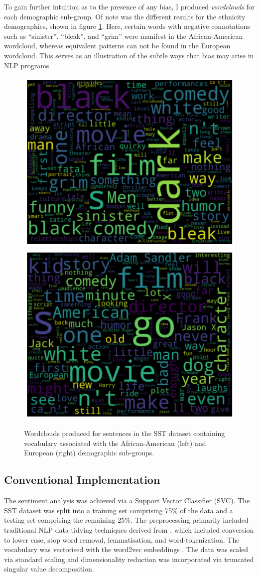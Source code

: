 \documentclass[a4paper]{IEEEtran}
\begin{document}
To gain further intuition as to the presence of any bias, I produced \textit{wordclouds} for each demographic sub-group. Of note was the different results for the ethnicity demographics, shown in figure \ref{fig:clouds}. Here, certain words with negative connotations such as ``sinister'', ``bleak'', and ``grim'' were manifest in the African-American wordcloud, whereas equivalent patterns can not be found in the European wordcloud. This serves as an illustration of the subtle ways that bias may arise in NLP programs. 

\begin{figure}[htbp]
\includegraphics[width=0.48\linewidth]{images/aa-word-cloud-big.png}
\includegraphics[width=0.48\linewidth]{images/e-word-cloud-big.png}
\caption{Wordclouds produced for sentences in the SST dataset containing vocabulary associated with the African-American (left) and European (right) demographic sub-groups.}
\label{fig:clouds}
\end{figure}

\subsection{Conventional Implementation}

The sentiment analysis was achieved via a Support Vector Classifier (SVC). The SST dataset was split into a training set comprising 75\% of the data and a testing set comprising the remaining 25\%. The preprocessing primarily included traditional NLP data tidying techniques derived from \cite{nltk}, which included conversion to lower case, stop word removal, lemmatisation, and word-tokenization. The vocabulary was vectorised with the word2vec embeddings \cite{b8}. The data was scaled via standard scaling and dimensionality reduction was incorporated via truncated singular value decomposition. 
\end{document}
